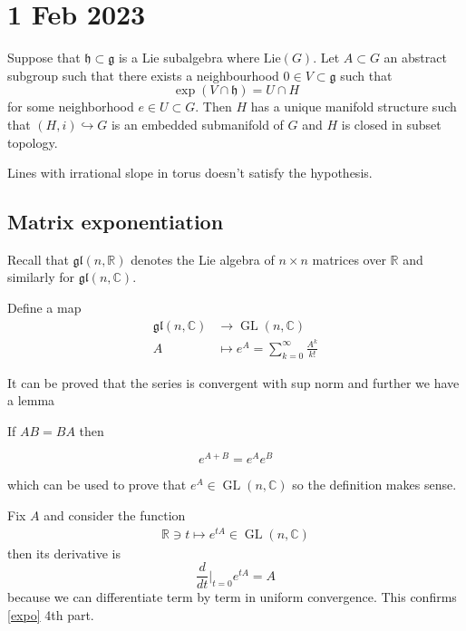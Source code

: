 \documentclass[11pt,a4paper]{scrarticle}
\theoremstyle{definition}
\theoremstyle{greenbox}
\newcommand{\R}{\mathbb{R}}
\newcommand{\C}{\mathbb{C}}
\begin{document}
\section{1 Feb 2023}
\vspace{0.5cm}
\begin{thm}
    Suppose that $ \mathfrak{h} \subset \mathfrak{g} $ is a Lie subalgebra where $ \text{Lie}(G) $. Let $ A \subset G $ an abstract subgroup such that there exists a neighbourhood $ 0 \in V \subset \mathfrak{g} $ such that 
    \[ \exp(V \cap \mathfrak{h}) = U \cap H \]
    for some neighborhood $ e \in U \subset G $. Then $ H $ has a unique manifold structure such that $ (H, i) \hookrightarrow G $ is an embedded submanifold of $ G $ and $ H $ is closed in subset topology.
\end{thm}
\begin{remark}
    Lines with irrational slope in torus doesn't satisfy the hypothesis.
\end{remark}

\subsection*{Matrix exponentiation} 

Recall that $ \mathfrak{gl}(n,\R) $ denotes the Lie algebra of $  n \times n $ matrices over $ \R $ and similarly for $ \mathfrak{gl}(n,\C) $. 
\begin{defn}
    Define a map \begin{align*}
        \mathfrak{gl}(n,\C) &\to \operatorname{GL}(n,\C) \\
        A &  \mapsto e^{A} = \sum_{k=0}^{\infty} \frac{A^{k}}{k!} 
    \end{align*}
\end{defn}
It can be proved that the series is convergent with sup norm and further we have a lemma
\begin{lemma}
    If $ AB=BA $ then 
    
    \[ e^{A+B} = e^{A}e^{B} \]
\end{lemma}
which can be used to prove that $ e^{A} \in \operatorname{GL}(n,\C) $ so the definition makes sense.

Fix $ A $  and consider the function \begin{align*}
    \R \ni t \mapsto e^{tA} \in \operatorname{GL}(n,\C)
\end{align*} then its derivative is 
\[ \frac{d}{dt}\bigg|_{t=0}e^{tA} = A \]
because we can differentiate term by term in uniform convergence. This confirms \cref{expo} 4th part.
\end{document}
